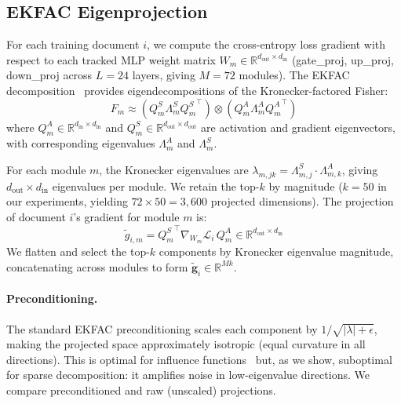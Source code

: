 
\subsection{EKFAC Eigenprojection}

For each training document $i$, we compute the cross-entropy loss gradient with respect to each tracked MLP weight matrix $W_m \in \mathbb{R}^{d_{\text{out}} \times d_{\text{in}}}$ (gate\_proj, up\_proj, down\_proj across $L{=}24$ layers, giving $M{=}72$ modules). The EKFAC decomposition~\citep{george2018fast} provides eigendecompositions of the Kronecker-factored Fisher:
\begin{equation}
    F_m \approx (Q_m^S \Lambda_m^S {Q_m^S}^\top) \otimes (Q_m^A \Lambda_m^A {Q_m^A}^\top)
\end{equation}
where $Q_m^A \in \mathbb{R}^{d_{\text{in}} \times d_{\text{in}}}$ and $Q_m^S \in \mathbb{R}^{d_{\text{out}} \times d_{\text{out}}}$ are activation and gradient eigenvectors, with corresponding eigenvalues $\Lambda_m^A$ and $\Lambda_m^S$.

For each module $m$, the Kronecker eigenvalues are $\lambda_{m,jk} = \Lambda^S_{m,j} \cdot \Lambda^A_{m,k}$, giving $d_{\text{out}} \times d_{\text{in}}$ eigenvalues per module. We retain the top-$k$ by magnitude ($k{=}50$ in our experiments, yielding $72 \times 50 = 3{,}600$ projected dimensions). The projection of document $i$'s gradient for module $m$ is:
\begin{equation}
    \tilde{g}_{i,m} = {Q_m^S}^\top \nabla_{W_m} \mathcal{L}_i \, Q_m^A \in \mathbb{R}^{d_{\text{out}} \times d_{\text{in}}}
\end{equation}
We flatten and select the top-$k$ components by Kronecker eigenvalue magnitude, concatenating across modules to form $\tilde{\mathbf{g}}_i \in \mathbb{R}^{Mk}$.

\paragraph{Preconditioning.} The standard EKFAC preconditioning scales each component by $1/\sqrt{|\lambda| + \epsilon}$, making the projected space approximately isotropic (equal curvature in all directions). This is optimal for influence functions~\citep{grosse2023studying} but, as we show, suboptimal for sparse decomposition: it amplifies noise in low-eigenvalue directions. We compare preconditioned and raw (unscaled) projections.


